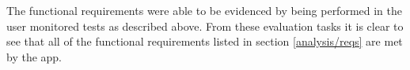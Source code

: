 \documentclass{l4proj}
\begin{document}
The functional requirements were able to be evidenced by being performed in the user monitored tests as described above. From these evaluation tasks it is clear to see that all of the functional requirements listed in section \ref{analysis/reqs} are met by the app. 


    
\end{document}
